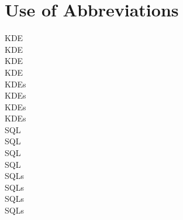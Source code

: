 \chapter{Use of Abbreviations}

\ac{KDE} %
\\
\acs{KDE} %
\\
\acf{KDE} %
\\
\acl{KDE} %
\\
\acp{KDE} %
\\
\acsp{KDE} %
\\
\acfp{KDE} %
\\
\aclp{KDE} %
\\
\ac{SQL}
\\
\acs{SQL}
\\
\acf{SQL}
\\
\acl{SQL}
\\
\acp{SQL}
\\
\acsp{SQL}
\\
\acfp{SQL}
\\
\aclp{SQL}